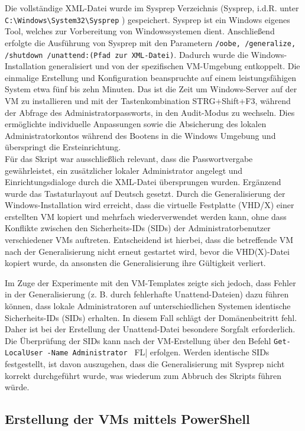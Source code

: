 \documentclass[a4paper,12pt]{article}
\begin{document}
Die vollständige XML-Datei wurde im Sysprep Verzeichnis (Sysprep, i.d.R. unter \verb|C:\Windows\System32\Sysprep|
) gespeichert. Sysprep ist ein Windows eigenes Tool, welches zur Vorbereitung von Windowssystemen dient.
Anschließend erfolgte die Ausführung von Sysprep mit den Parametern \lstinline|/oobe, /generalize, /shutdown /unattend:(Pfad zur XML-Datei)|. 
Dadurch wurde die Windows-Installation generalisiert und von der spezifischen VM-Umgebung entkoppelt. 
Die einmalige Erstellung und Konfiguration beanspruchte auf einem leistungsfähigen System etwa fünf bis zehn Minuten.
Das ist die Zeit um Windows-Server auf der VM zu installieren und mit der Tastenkombination STRG+Shift+F3, während der Abfrage des Administratorpassworts, in den Audit-Modus zu wechseln.
Dies ermöglichte individuelle Anpassungen sowie die Absicherung des lokalen Administratorkontos während des Bootens in die Windows Umgebung und überspringt die Ersteinrichtung.\\

Für das Skript war ausschließlich relevant, dass die Passwortvergabe gewährleistet, ein zusätzlicher lokaler Administrator angelegt und Einrichtungsdialoge durch die XML-Datei übersprungen wurden. Ergänzend wurde das Tastaturlayout auf Deutsch gesetzt.
Durch die Generalisierung der Windows-Installation wird erreicht, dass die virtuelle Festplatte (VHD/X) einer erstellten VM kopiert und mehrfach wiederverwendet werden kann, ohne dass Konflikte zwischen den Sicherheits-IDs (SIDs) der Administratorbenutzer verschiedener VMs auftreten. 
Entscheidend ist hierbei, dass die betreffende VM nach der Generalisierung nicht erneut gestartet wird, bevor die VHD(X)-Datei kopiert wurde, da ansonsten die Generalisierung ihre Gültigkeit verliert.

Im Zuge der Experimente mit den VM-Templates zeigte sich jedoch, dass Fehler in der Generalisierung (z. B. durch fehlerhafte Unattend-Dateien) dazu führen können, dass lokale Administratoren auf unterschiedlichen Systemen identische Sicherheits-IDs (SIDs) erhalten. 
In diesem Fall schlägt der Domänenbeitritt fehl. Daher ist bei der Erstellung der Unattend-Datei besondere Sorgfalt erforderlich. 
Die Überprüfung der SIDs kann nach der VM-Erstellung über den Befehl \lstinline|Get-LocalUser -Name Administrator | FL| erfolgen. 
Werden identische SIDs festgestellt, ist davon auszugehen, dass die Generalisierung mit Sysprep nicht korrekt durchgeführt wurde, was wiederum zum Abbruch des Skripts führen würde.


\subsection{Erstellung der VMs mittels PowerShell}
\end{document}
